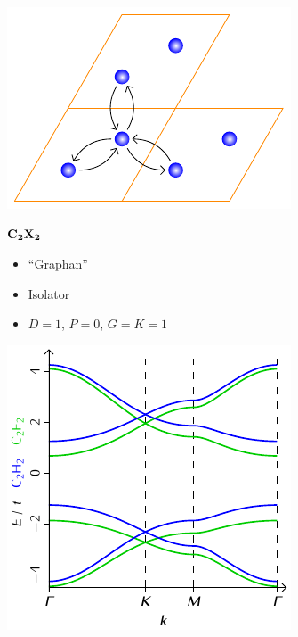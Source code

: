 \documentclass{beamer}
\newcommand \inlinetitle[1]{\begin{center} \color{MidnightBlue} \bf \Large #1 \end{center}}
\begin{document}
	\begin{frame}
		\begin{minipage}[b][0.48\textwidth][c]{0.48\textwidth}
			\includegraphics[width=\textwidth]{Abbildungen/Raumstrukturen/C2X2.pdf}
		\end{minipage}
		\hfill
		\begin{minipage}[b][0.48\textwidth][c]{0.48\textwidth}
			\inlinetitle{$\bf C_{\boldsymbol 2}X_{\boldsymbol 2}$}
			\begin{itemize}
				\item "`Graphan"'
				\item Isolator
				\item $D = 1$, $P = 0$, $G = K = 1$
			\end{itemize}
		\end{minipage}
		\begin{minipage}{0.48\textwidth}
			\includegraphics[width=\textwidth]{Abbildungen/Bandstrukturen/C2X2.pdf}

\end{minipage}
\end{frame}
\end{document}
